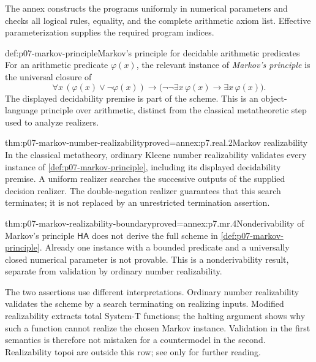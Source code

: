 The annex constructs the programs uniformly in numerical parameters and
checks all logical rules, equality, and the complete arithmetic axiom
list. Effective parameterization supplies the required program indices.



\begin{hbdefinition}{def:p07-markov-principle}{Markov's principle for decidable arithmetic predicates}
For an arithmetic predicate \(\varphi(x)\), the relevant instance of
\emph{Markov's principle} is the universal closure of
\[
 \forall x\,(\varphi(x)\lor\neg\varphi(x))
 \to
 \bigl(\neg\neg\exists x\,\varphi(x)\to\exists x\,\varphi(x)\bigr).
\]
The displayed decidability premise is part of the scheme.  This is an
object-language principle over arithmetic, distinct from the classical
metatheoretic step used to analyze realizers.
\end{hbdefinition}



\begin{hblemma}{thm:p07-markov-number-realizability}{proved=annex:p7.real.2}{Markov realizability}
In the classical metatheory, ordinary Kleene number realizability
validates every instance of \cref{def:p07-markov-principle}, including
its displayed decidability premise. A uniform realizer searches the
successive outputs of the supplied decision realizer. The double-negation
realizer guarantees that this search terminates; it is not replaced by
an unrestricted termination assertion.
\end{hblemma}

\begin{hbtheorem}{thm:p07-markov-realizability-boundary}{proved=annex:p7.mr.4}{Nonderivability of Markov's principle}
\(\mathsf{HA}\) does not derive the full scheme in
\cref{def:p07-markov-principle}. Already one instance with a bounded
predicate and a universally closed numerical parameter is not provable.
This is a nonderivability result, separate from validation by ordinary
number realizability.
\end{hbtheorem}

The two assertions use different interpretations. Ordinary number
realizability validates the scheme by a search terminating on realizing
inputs. Modified realizability extracts total System-T functions; the
halting argument shows why such a function cannot realize the chosen
Markov instance. Validation in the first semantics is therefore not
mistaken for a countermodel in the second.  Realizability
topoi are outside this row; see \cite{VanOosten2008} only for further reading.

